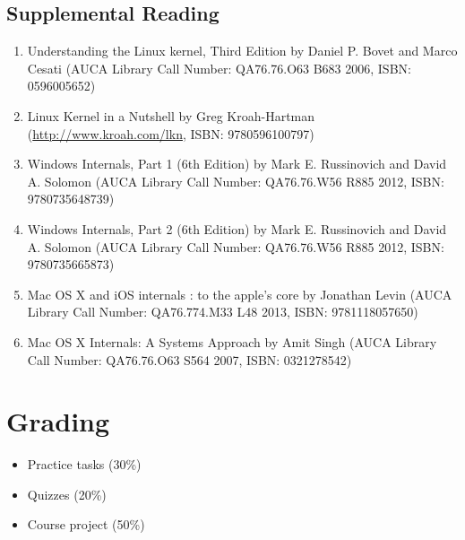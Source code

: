 \documentclass[12pt,a4paper,oneside]{article}
\begin{document}
        \subsection{Supplemental Reading}
            \begin{enumerate}
                \item Understanding the Linux kernel, Third Edition by Daniel P. Bovet and Marco Cesati (AUCA Library Call Number: QA76.76.O63 B683 2006, ISBN: 0596005652)
                \item Linux Kernel in a Nutshell by Greg Kroah-Hartman (\href{http://www.kroah.com/lkn}{http://www.kroah.com/lkn}, ISBN: 9780596100797)
                \item Windows Internals, Part 1 (6th Edition) by Mark E. Russinovich and David A. Solomon (AUCA Library Call Number: QA76.76.W56 R885 2012, ISBN: 9780735648739)
                \item Windows Internals, Part 2 (6th Edition) by Mark E. Russinovich and David A. Solomon (AUCA Library Call Number: QA76.76.W56 R885 2012, ISBN: 9780735665873)
                \item Mac OS X and iOS internals : to the apple's core by Jonathan Levin (AUCA Library Call Number: QA76.774.M33 L48 2013, ISBN: 9781118057650)
                \item Mac OS X Internals: A Systems Approach by Amit Singh (AUCA Library Call Number: QA76.76.O63 S564 2007, ISBN: 0321278542)
            \end{enumerate}

    \section{Grading}

        \begin{itemize}
            \item Practice tasks (30\%)
            \item Quizzes (20\%)
            \item Course project (50\%)
        \end{itemize}
\end{document}
